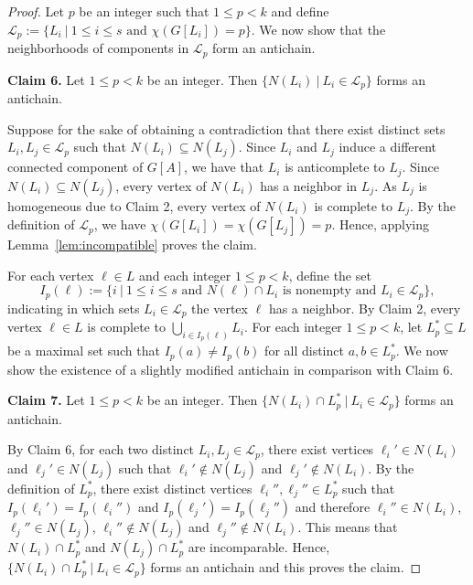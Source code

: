 \documentclass[10pt]{article}
\theoremstyle{definition}
\begin{document}
\begin{proof}
Let $p$ be an integer such that $1 \leq p<k$ and define $\mathcal{L}_p := \{L_i ~|~ 1 \leq i \leq s\text{ and }\chi(G[L_i])=p\}$. We now show that the neighborhoods of components in $\mathcal{L}_p$ form an antichain.

\noindent \textbf{Claim 6.} Let $1 \leq p <k$ be an integer. Then $\{N(L_i)~|~L_i \in \mathcal{L}_p\}$ forms an antichain.

\bigskip

Suppose for the sake of obtaining a contradiction that there exist distinct sets $L_i, L_j \in \mathcal{L}_p$ such that $N(L_i) \subseteq N(L_j)$. Since $L_i$ and $L_j$ induce a different connected component of $G[A]$, we have that $L_i$ is anticomplete to $L_j$. Since $N(L_i)\subseteq N(L_j)$, every vertex of $N(L_i)$ has a neighbor in $L_j$. As $L_j$ is homogeneous due to Claim 2, every vertex of $N(L_i)$ is complete to $L_j$. By the definition of $\mathcal{L}_p$, we have $\chi(G[L_i])=\chi(G[L_j])=p$. Hence, applying Lemma~\ref{lem:incompatible} proves the claim.
\bigskip

\noindent

For each vertex $\ell \in L$ and each integer $1 \leq p<k$, define the set 
$$I_p(\ell) := \{i~|~1 \leq i \leq s\text{ and }N(\ell) \cap L_i\text{ is nonempty and }L_i \in \mathcal{L}_p\},$$ 
indicating in which sets $L_i \in \mathcal{L}_p$ the vertex $\ell$ has a neighbor. By Claim 2, every vertex $\ell \in L$ is complete to $\bigcup_{i \in I_p(\ell)}L_{i}$. For each integer $1 \leq p<k$, let $L_p^* \subseteq L$ be a maximal set such that $I_p(a) \neq I_p(b)$ for all distinct $a, b \in L_p^*$. We now show the existence of a slightly modified antichain in comparison with Claim 6.

\noindent \textbf{Claim 7.} Let $1 \leq p <k$ be an integer. Then $\{N(L_i) \cap L_p^*~|~L_i \in \mathcal{L}_p\}$ forms an antichain.

\bigskip

By Claim 6, for each two distinct $L_i, L_j \in \mathcal{L}_p$, there exist vertices $\ell_i' \in N(L_i)$ and $\ell_j' \in N(L_j)$ such that $\ell_i' \notin N(L_j)$ and $\ell_j' \notin N(L_i)$. By the definition of $L_p^*$, there exist distinct vertices $\ell_i'' ,\ell_j''\in L_p^*$ such that $I_p(\ell_i')=I_p(\ell_i'')$ and  $I_p(\ell_j')=I_p(\ell_j'')$ and therefore $\ell_i'' \in N(L_i)$, $\ell_j'' \in N(L_j)$, $\ell_i'' \notin N(L_j)$ and $\ell_j'' \notin N(L_i)$. This means that $N(L_i) \cap L_p^*$ and $N(L_j) \cap L_p^*$ are incomparable. Hence, $\{N(L_i) \cap L_p^*~|~L_i \in \mathcal{L}_p\}$ forms an antichain and this proves the claim.
\bigskip


\end{proof}
\end{document}
